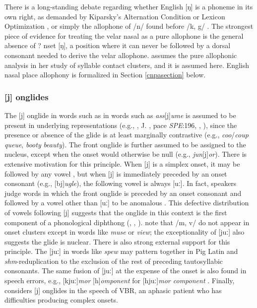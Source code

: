 There is a long-standing debate regarding whether English [ŋ] is a phoneme in its own right, as demanded by Kiparsky's Alternation Condition \citep{Kiparsky1968} or Lexicon Optimization \citep[][53]{OT}, or simply the allophone of /n/ found before /k, g/ \citep[][65]{Borowsky1986}. The strongest piece of evidence for treating the velar nasal as a pure allophone is the general absence of ?
nset [ŋ], a position where it can never be followed by a dorsal consonant needed to derive the velar allophone. \citet{Pierrehumbert1994} assumes the pure allophonic analysis in her study of syllable contact clusters, and it is assumed here. English nasal place allophony is formalized in Section \ref{cnpasection} below.

\subsubsection{[j] onglides}

The [j] onglide in words such as in words such as \emph{ass}[j]\emph{ume} is assumed to be present in underlying representations (e.g., \citealt[][278]{Borowsky1986}, J. \citealt{Anderson1988b}, pace \emph{SPE}:196, \citealt[][89]{Halle1985a}, \citealt[][217]{McMahon1990}), since the presence or absence of the glide is at least marginally contrastive (e.g., \emph{coo}/\emph{coup} \alt{} \emph{queue}, \emph{booty} \alt{} \emph{beauty}). The front onglide is further assumed to be assigned to the nucleus, except when the onset would otherwise be null (e.g., \emph{jun}[j]\emph{or}). 
There is extensive motivation for this principle. When [j] is a simplex onset, it may be followed by any vowel \citep[][276]{Borowsky1986}, but when [j] is immediately preceded by an onset consonant (e.g., [bj]\emph{ugle}), the following vowel is always [uː]. In fact, speakers judge words in which the front onglide is preceded by an onset consonant and followed by a vowel other than [uː] to be anomalous \citep{Moreland2009}. This defective distribution of vowels following [j] suggests that the onglide in this context is the first component of a phonological diphthong (\citealp[][232]{Hayes1980}, \citealp[][61f.]{Harris1994}, \citealp{Davis1995}). \citet[][42]{Clements1983} note that /m, v/ do not appear in onset clusters except in words like \emph{muse} or \emph{view}; the exceptionality of [juː] also suggests the glide is nuclear. There is also strong external support for this principle. The [juː] in words like \emph{spew} may pattern together in Pig Latin \citep{Davis1995,Idsardi2005} and \emph{shm}-reduplication \citep{Nevins2003} to the exclusion of the rest of preceding tautosyllabic consonants. The same fusion of [juː] at the expense of the onset is also found in speech errors, e.g., [kjuː]\emph{mor} [h]\emph{omponent} for [hjuː]\emph{mor component} \citep[][130]{Shattuck-Hufnagel1986}. Finally, \citet{Buchwald2005} considers [j] onglides in the speech of VBR, an aphasic patient who has difficulties producing complex onsets. 

